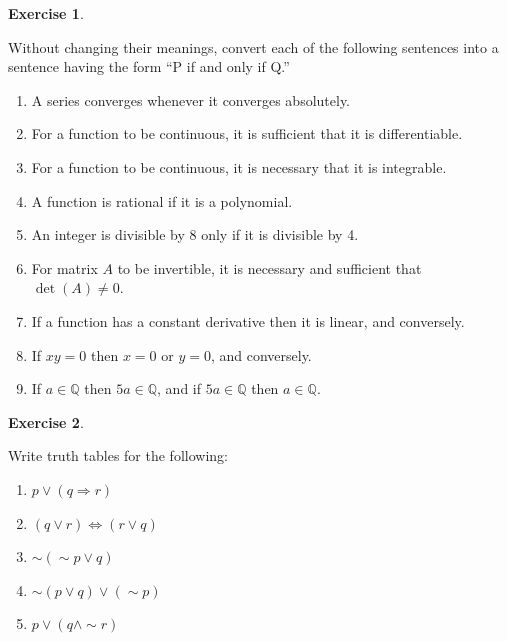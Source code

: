 \documentclass[
]{book}
\providecommand{\tightlist}{%
  \setlength{\itemsep}{0pt}\setlength{\parskip}{0pt}}
\theoremstyle{definition}
\theoremstyle{definition}
\theoremstyle{definition}
\newtheorem{exercise}{Exercise}[chapter]
\theoremstyle{definition}
\theoremstyle{remark}
\begin{document}
\begin{exercise}
\protect\hypertarget{exr:unnamed-chunk-132}{}\label{exr:unnamed-chunk-132}

Without changing their meanings, convert each of the following sentences into a
sentence having the form ``P if and only if Q.''

\begin{enumerate}
\def\labelenumi{\arabic{enumi}.}
\tightlist
\item
  A series converges whenever it converges absolutely.\\
\item
  For a function to be continuous, it is sufficient that it is differentiable.
\item
  For a function to be continuous, it is necessary that it is integrable.\\
\item
  A function is rational if it is a polynomial.\\
\item
  An integer is divisible by 8 only if it is divisible by 4.
\item
  For matrix \(A\) to be invertible, it is necessary and sufficient that \(\det(A) \neq 0\).\\
\item
  If a function has a constant derivative then it is linear, and conversely.\\
\item
  If \(xy = 0\) then \(x = 0\) or \(y = 0\), and conversely.\\
\item
  If \(a \in \mathbb{Q}\) then \(5a \in \mathbb{Q}\), and if \(5a \in \mathbb{Q}\) then \(a \in \mathbb{Q}\).
\end{enumerate}

\end{exercise}

\begin{exercise}
\protect\hypertarget{exr:unnamed-chunk-133}{}\label{exr:unnamed-chunk-133}

Write truth tables for the following:

\begin{enumerate}
\def\labelenumi{(\roman{enumi})}
\tightlist
\item
  \(p \lor (q \Rightarrow r)\)\\
\item
  \((q \lor r) \Leftrightarrow (r \lor q)\)\\
\item
  \(\sim(\sim p \lor q)\)\\
\item
  \(\sim(p \lor q) \lor (\sim p)\)\\
\item
  \(p \lor (q \land \sim r)\)
\end{enumerate}

\end{exercise}
\end{document}

